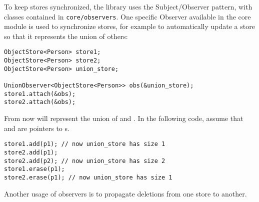 To keep stores synchronized, the library uses the Subject/Observer pattern, with classes contained in \texttt{core/observers}. One specific Observer available in the core module is used to synchronize stores, for example to automatically update a store so that it represents the union of others:
\begin{lstlisting}[style=c++]
ObjectStore<Person> store1;
ObjectStore<Person> store2;
ObjectStore<Person> union_store;

UnionObserver<ObjectStore<Person>> obs(&union_store);
store1.attach(&obs);
store2.attach(&obs);
\end{lstlisting} 
From now  will represent the union of and . In the following code, assume that  and  are pointers to s.
\begin{lstlisting}[style=c++]
store1.add(p1); // now union_store has size 1
store2.add(p1);
store2.add(p2); // now union_store has size 2
store1.erase(p1);
store2.erase(p1); // now union_store has size 1
\end{lstlisting}
Another usage of observers is to propagate deletions from one store to another.